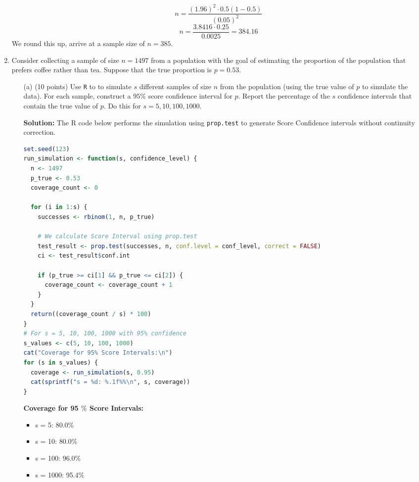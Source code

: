 \documentclass[12pt,letterpaper]{article}
\begin{document}
\begin{enumerate}[leftmargin=*]
\[ n = \frac{(1.96)^2 \cdot 0.5(1-0.5)}{(0.05)^2} \]
\[ n = \frac{3.8416 \cdot 0.25}{0.0025} = 384.16 \]
We round this up, arrive at a sample size of $n = 385$.


\item Consider collecting a sample of size $n = 1497$ from a population with the goal of estimating the proportion of the population that prefers coffee rather than tea. Suppose that the true proportion is $p = 0.53$. 
\begin{itemize}
    \item [(a)] (10 points) Use \texttt{R} to to simulate $s$ different samples of size $n$ from the population (using the true value of $p$ to simulate the data). For each sample, construct a $95\%$ score confidence interval for $p$. Report the percentage of the $s$ confidence intervals that contain the true value of $p$. Do this for $s = 5, 10, 100, 1000$.
    
    \textbf{Solution:}
    The R code below performs the simulation using \texttt{prop.test} to generate Score Confidence intervals without continuity correction.

\begin{lstlisting}[language=R]
set.seed(123)
run_simulation <- function(s, confidence_level) {
  n <- 1497
  p_true <- 0.53
  coverage_count <- 0
  
  for (i in 1:s) {
    successes <- rbinom(1, n, p_true)
    
    # We calculate Score Interval using prop.test 
    test_result <- prop.test(successes, n, conf.level = conf_level, correct = FALSE)
    ci <- test_result$conf.int
    
    if (p_true >= ci[1] && p_true <= ci[2]) {
      coverage_count <- coverage_count + 1
    }
  }
  return((coverage_count / s) * 100)
}
# For s = 5, 10, 100, 1000 with 95% confidence
s_values <- c(5, 10, 100, 1000)
cat("Coverage for 95% Score Intervals:\n")
for (s in s_values) {
  coverage <- run_simulation(s, 0.95)
  cat(sprintf("s = %d: %.1f%%\n", s, coverage))
}
\end{lstlisting}

    \textbf{Coverage for 95 $\%$ Score Intervals:}
    \begin{itemize}
        \item s = 5: 80.0\%
        \item s = 10: 80.0\%
        \item s = 100: 96.0\%
        \item s = 1000: 95.4\%
    \end{itemize}
    

\end{itemize}
\end{enumerate}
\end{document}
